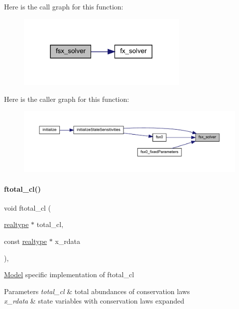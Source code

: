 Here is the call graph for this function\+:
\nopagebreak
\begin{figure}[H]
\begin{center}
\leavevmode
\includegraphics[width=233pt]{classamici_1_1_model_acaa80cbfc886abd3a0f038f5ff9f54e3_cgraph}
\end{center}
\end{figure}
Here is the caller graph for this function\+:
\nopagebreak
\begin{figure}[H]
\begin{center}
\leavevmode
\includegraphics[width=350pt]{classamici_1_1_model_acaa80cbfc886abd3a0f038f5ff9f54e3_icgraph}
\end{center}
\end{figure}
\mbox{\label{classamici_1_1_model_ab7c357d92ab37cfe9728a31e4232cfe9}} 
\paragraph{\texorpdfstring{ftotal\_cl()}{ftotal\_cl()}}
{\footnotesize\ttfamily void ftotal\+\_\+cl (\begin{DoxyParamCaption}\item[{\mbox{\hyperlink{namespaceamici_a1bdce28051d6a53868f7ccbf5f2c14a3}{realtype}} $\ast$}]{total\+\_\+cl,  }\item[{const \mbox{\hyperlink{namespaceamici_a1bdce28051d6a53868f7ccbf5f2c14a3}{realtype}} $\ast$}]{x\+\_\+rdata }\end{DoxyParamCaption})\hspace{0.3cm}{\ttfamily [protected]}, {\ttfamily [virtual]}}

\mbox{\hyperlink{classamici_1_1_model}{Model}} specific implementation of ftotal\+\_\+cl 
\begin{DoxyParams}{Parameters}
{\em total\+\_\+cl} & total abundances of conservation laws \\
\hline
{\em x\+\_\+rdata} & state variables with conservation laws expanded \\
\hline
\end{DoxyParams}


